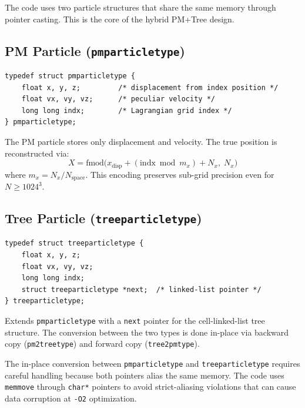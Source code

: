 \documentclass[11pt,fleqn]{book}
\newcommand{\code}[1]{\texttt{#1}}
\begin{document}
The code uses two particle structures that share the same memory through pointer casting.  This is the core of the hybrid PM+Tree design.

\subsection{PM Particle (\code{pmparticletype})}

\begin{definition}
\begin{lstlisting}[style=ccode,numbers=none]
typedef struct pmparticletype {
    float x, y, z;         /* displacement from index position */
    float vx, vy, vz;      /* peculiar velocity */
    long long indx;        /* Lagrangian grid index */
} pmparticletype;
\end{lstlisting}
The PM particle stores only displacement and velocity.  The true position is reconstructed via:
\[
  X = \text{fmod}\!\Big(x_\text{disp} + (\text{indx} \bmod m_x) + N_x,\; N_x\Big)
\]
where $m_x = N_x / N_\text{space}$.  This encoding preserves sub-grid precision even for $N \geq 1024^3$.
\end{definition}

\subsection{Tree Particle (\code{treeparticletype})}

\begin{definition}
\begin{lstlisting}[style=ccode,numbers=none]
typedef struct treeparticletype {
    float x, y, z;
    float vx, vy, vz;
    long long indx;
    struct treeparticletype *next;  /* linked-list pointer */
} treeparticletype;
\end{lstlisting}
Extends \code{pmparticletype} with a \code{next} pointer for the cell-linked-list tree structure.  The conversion between the two types is done in-place via backward copy (\code{pm2treetype}) and forward copy (\code{tree2pmtype}).
\end{definition}

\begin{important}
The in-place conversion between \code{pmparticletype} and \code{treeparticletype} requires careful handling because both pointers alias the same memory.  The code uses \code{memmove} through \code{char*} pointers to avoid strict-aliasing violations that can cause data corruption at \code{-O2} optimization.
\end{important}
\end{document}
